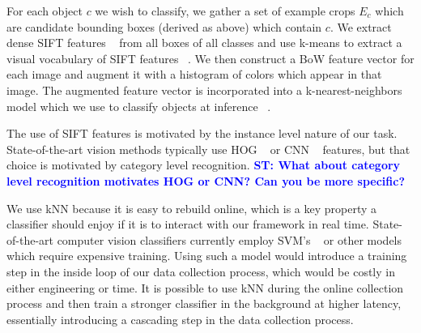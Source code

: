 \documentclass[conference]{IEEEtran}
\newcommand{\stnote}[1]{\textcolor{blue}{\textbf{ST: #1}}}
\begin{document}
For each object $c$ we wish to classify, we gather a set of example crops $E_c$ which are candidate
bounding boxes (derived as above) which contain $c$. We extract dense SIFT features ~\citep{} from all boxes of
all classes and use k-means to extract a visual vocabulary of SIFT features ~\citep{}. We then construct a
BoW feature vector for each image and augment it with a histogram of colors which appear in that image.
The augmented feature vector is incorporated into a k-nearest-neighbors model which we use to classify
objects at inference ~\citep{}.

The use of SIFT features is motivated by the instance level nature of our task. State-of-the-art vision
methods typically use HOG ~\citep{} or CNN ~\citep{} features, but that choice is motivated by category
level recognition. \stnote{What about category level recognition motivates HOG or CNN?  Can you be more specific?}

We use kNN because it is easy to rebuild online, which is a key property a classifier should enjoy
if it is to interact with our framework in real time. State-of-the-art computer vision classifiers
currently employ SVM's ~\citep{} or other models which require expensive training. Using such a model would
introduce a training step in the inside loop of our data collection process, which would be costly
in either engineering or time.  It is possible to use kNN during the online collection process and then
train a stronger classifier in the background at higher latency, essentially introducing a cascading step
in the data collection process.
\end{document}
